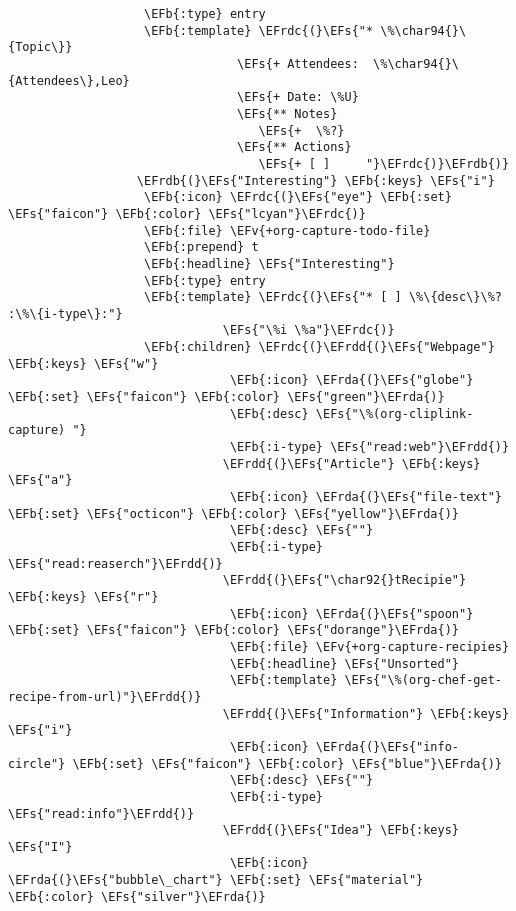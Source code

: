 \documentclass[c]{article}
\theoremstyle{plain}%
\theoremstyle{definition}
\theoremstyle{remark}
\newcommand{\EFs}[1]{\textcolor{EFs}{#1}} %
\newcommand{\EFb}[1]{\textcolor{EFb}{#1}} %
\newcommand{\EFv}[1]{\textcolor{EFv}{#1}} %
\newcommand{\EFrda}[1]{\textcolor{EFrda}{#1}} %
\newcommand{\EFrdb}[1]{\textcolor{EFrdb}{#1}} %
\newcommand{\EFrdc}[1]{\textcolor{EFrdc}{#1}} %
\newcommand{\EFrdd}[1]{\textcolor{EFrdd}{#1}} %
\begin{document}
\begin{Code}
\begin{Verbatim}
                   \EFb{:type} entry
                   \EFb{:template} \EFrdc{(}\EFs{"* \%\char94{}\{Topic\}}
                                \EFs{+ Attendees:  \%\char94{}\{Attendees\},Leo}
                                \EFs{+ Date: \%U}
                                \EFs{** Notes}
                                   \EFs{+  \%?}
                                \EFs{** Actions}
                                   \EFs{+ [ ]     "}\EFrdc{)}\EFrdb{)}
                  \EFrdb{(}\EFs{"Interesting"} \EFb{:keys} \EFs{"i"}
                   \EFb{:icon} \EFrdc{(}\EFs{"eye"} \EFb{:set} \EFs{"faicon"} \EFb{:color} \EFs{"lcyan"}\EFrdc{)}
                   \EFb{:file} \EFv{+org-capture-todo-file}
                   \EFb{:prepend} t
                   \EFb{:headline} \EFs{"Interesting"}
                   \EFb{:type} entry
                   \EFb{:template} \EFrdc{(}\EFs{"* [ ] \%\{desc\}\%? :\%\{i-type\}:"}
                              \EFs{"\%i \%a"}\EFrdc{)}
                   \EFb{:children} \EFrdc{(}\EFrdd{(}\EFs{"Webpage"} \EFb{:keys} \EFs{"w"}
                               \EFb{:icon} \EFrda{(}\EFs{"globe"} \EFb{:set} \EFs{"faicon"} \EFb{:color} \EFs{"green"}\EFrda{)}
                               \EFb{:desc} \EFs{"\%(org-cliplink-capture) "}
                               \EFb{:i-type} \EFs{"read:web"}\EFrdd{)}
                              \EFrdd{(}\EFs{"Article"} \EFb{:keys} \EFs{"a"}
                               \EFb{:icon} \EFrda{(}\EFs{"file-text"} \EFb{:set} \EFs{"octicon"} \EFb{:color} \EFs{"yellow"}\EFrda{)}
                               \EFb{:desc} \EFs{""}
                               \EFb{:i-type} \EFs{"read:reaserch"}\EFrdd{)}
                              \EFrdd{(}\EFs{"\char92{}tRecipie"} \EFb{:keys} \EFs{"r"}
                               \EFb{:icon} \EFrda{(}\EFs{"spoon"} \EFb{:set} \EFs{"faicon"} \EFb{:color} \EFs{"dorange"}\EFrda{)}
                               \EFb{:file} \EFv{+org-capture-recipies}
                               \EFb{:headline} \EFs{"Unsorted"}
                               \EFb{:template} \EFs{"\%(org-chef-get-recipe-from-url)"}\EFrdd{)}
                              \EFrdd{(}\EFs{"Information"} \EFb{:keys} \EFs{"i"}
                               \EFb{:icon} \EFrda{(}\EFs{"info-circle"} \EFb{:set} \EFs{"faicon"} \EFb{:color} \EFs{"blue"}\EFrda{)}
                               \EFb{:desc} \EFs{""}
                               \EFb{:i-type} \EFs{"read:info"}\EFrdd{)}
                              \EFrdd{(}\EFs{"Idea"} \EFb{:keys} \EFs{"I"}
                               \EFb{:icon} \EFrda{(}\EFs{"bubble\_chart"} \EFb{:set} \EFs{"material"} \EFb{:color} \EFs{"silver"}\EFrda{)}

\end{Verbatim}
\end{Code}
\end{document}
